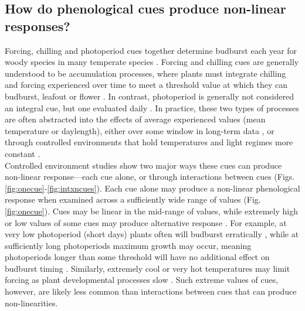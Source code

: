 \documentclass[11pt,letter]{article}
\begin{document}
\subsection{How do phenological cues produce non-linear responses?}
Forcing, chilling and photoperiod cues together determine budburst each year for woody species in many temperate species \citep[e.g.,][]{chuinearees,ettinger2020}. Forcing and chilling cues are generally understood to be accumulation processes, where plants must integrate chilling and forcing experienced over time to meet a threshold value at which they can budburst, leafout or flower \citep{Chuine2000}. In contrast, photoperiod is generally not considered an integral cue, but one evaluated daily \citep{Singh:2017}. In practice, these two types of processes are often abstracted into the effects of average experienced values (mean temperature or daylength), either over some window in long-term data \citep[e.g.,][]{Wolkovich:2012n,fu2015}, or through controlled environments that hold temperatures and light regimes more constant \citep[e.g.,][]{Worrall:1967aa,Heide:1993,Heide:1993a,Skuterud:1994aa}. \\

Controlled environment studies show two major ways these cues can produce non-linear response---each cue alone, or through interactions between cues (Figs. \ref{fig:onecue}-\ref{fig:intxncues}). Each cue alone may produce a non-linear phenological response when examined across a sufficiently wide range of values (Fig. \ref{fig:onecue}). Cues may be linear in the mid-range of values, while extremely high or low values of some cues may produce alternative response \citep{gauzere2017}. For example, at very low photoperiod (short days) plants often will budburst erratically \citep{Heide:1993,Partanen:1998aa,Singh:2017,rinne2018}, while at sufficiently long photoperiods maximum growth may occur, meaning photoperiods longer than some threshold will have no additional effect on budburst timing \citep[e.g.,][]{major1980}. Similarly, extremely cool or very hot temperatures may limit forcing as plant developmental processes slow \citep{parent2012}. Such extreme values of cues, however, are likely less common than interactions between cues that can produce non-linearities.\\
\end{document}
